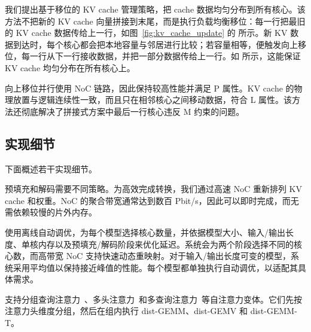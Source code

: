  我们提出基于移位的 KV cache 管理策略，把 cache 数据均匀分布到所有核心。该方法不把新的 KV cache 向量拼接到末尾，而是执行负载均衡移位：每一行把最旧的 KV cache 数据传给上一行，如图~\ref{fig:kv_cache_update} 的  所示。新 KV 数据到达时，每个核心都会把本地容量与邻居进行比较；若容量相等，便触发向上移位，每一行从下一行接收数据，并把一部分数据传给上一行。如  所示，这能保证 KV cache 均匀分布在所有核心上。

向上移位并行使用 NoC 链路，因此保持较高性能并满足 P 属性。KV cache 的物理放置与逻辑连续性一致，而且只在相邻核心之间移动数据，符合 L 属性。该方法还彻底解决了拼接式方案中最后一行核心违反 M 约束的问题。

\vspace{-3mm}
\subsection{实现细节}
\vspace{-1mm}

下面概述若干实现细节。

 预填充和解码需要不同策略。为高效完成转换，我们通过高速 NoC 重新排列 KV cache 和权重。NoC 的聚合带宽通常达到数百 Pbit/s，因此可以即时完成，而无需依赖较慢的片外内存。

 \sys 使用离线自动调优，为每个模型选择核心数量，并依据模型大小、输入/输出长度、单核内存以及预填充/解码阶段来优化延迟。系统会为两个阶段选择不同的核心数，而高带宽 NoC 支持快速动态重映射。对于输入/输出长度可变的模型，系统采用平均值以保持接近峰值的性能。每个模型都单独执行自动调优，以适配其具体需求。

 \sys 支持分组查询注意力~\cite{gqa}、多头注意力~\cite{mha}和多查询注意力~\cite{mqa}等自注意力变体。它们先按注意力头维度分组，然后在组内执行 dist-GEMM、dist-GEMV 和 dist-GEMM-T。
